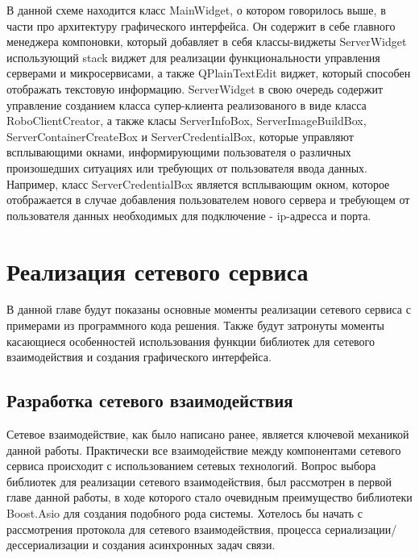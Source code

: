 \documentclass[a4paper, 14pt]{extreport}
\begin{document}
\par В данной схеме находится класс MainWidget, о котором говорилось выше, в части про архитектуру графического интерфейса. Он содержит 
в себе главного менеджера компоновки, который добавляет в себя классы-виджеты ServerWidget использующий stack виджет для реализации 
функциональности управления серверами и микросервисами, а также QPlainTextEdit виджет, который способен отображать текстовую информацию.
ServerWidget в свою очередь содержит управление созданием класса супер-клиента реализованого в виде класса RoboClientCreator, а также 
класы ServerInfoBox, ServerImageBuildBox, ServerContainerCreateBox и ServerCredentialBox, которые управляют всплывающими окнами, 
информирующими пользователя о различных произошедших ситуациях или требующих от пользователя ввода данных. Например, класс 
ServerCredentialBox является всплывающим окном, которое отображается в случае добавления пользователем нового сервера и требующем от 
пользователя данных необходимых для подключение - ip-адресса и порта.
\chapter{Реализация сетевого сервиса}
\par В данной главе будут показаны основные моменты реализации сетевого сервиса с примерами из программного кода решения. Также будут 
затронуты моменты касающиеся особенностей использования функции библиотек для сетевого взаимодействия и создания графического интерфейса.
\section {Разработка сетевого взаимодействия}
\par Сетевое взаимодействие, как было написано ранее, является ключевой механикой данной работы. Практически все взаимодействие между 
компонентами сетевого сервиса происходит с использованием сетевых технологий. Вопрос выбора библиотек для реализации сетевого
взаимодействия, был рассмотрен в первой главе данной работы, в ходе которого стало очевидным преимущество библиотеки Boost.Asio для 
создания подобного рода системы. Хотелось бы начать с рассмотрения протокола для сетевого взаимодействия, процесса
сериализации/дессериализации и создания асинхронных задач связи.
\end{document}
